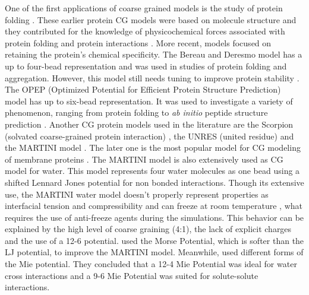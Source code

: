 One of the first applications of coarse grained models is the study of protein folding \cite{levitt1975,levitt1976}. These earlier protein CG models were based on molecule structure and they contributed for the knowledge of physicochemical forces associated with protein folding and protein interactions \cite{koga2001}.  More recent, models focused on retaining the protein's chemical specificity. The Bereau and Deresmo model \cite{bereau2009} has a up to four-bead representation and was used in studies of protein folding and aggregation. However, this model still needs tuning to improve protein stability \cite{bereau2010}. The OPEP (Optimized Potential for Efficient Protein Structure Prediction) model \cite{opep2014,opep2015} has up to six-bead representation. It was used to investigate a variety of phenomenon, ranging from protein folding to \textit{ab initio} peptide structure prediction \cite{opep2011,opep2009,opep20092}. Another CG protein models used in the literature are the Scorpion (solvated coarse-grained protein interaction)  \cite{scorpion2013}, the UNRES (united residue) \cite{unres2014} and the MARTINI model \cite{martini2013}. The later one is the most popular model for CG modeling of membrane proteins \cite{martini20132}. The MARTINI model is also extensively used as CG model for water. This model represents four water molecules as one bead using a shifted Lennard Jones potential for non bonded interactions. Though its extensive use, the MARTINI water model doesn't properly represent properties as interfacial tension and compressibility \cite{shinoda2010} and can freeze at room temperature \cite{winger2009,martini2007}, what requires the use of anti-freeze agents during the simulations. This behavior can be explained by the high level of coarse graining (4:1), the lack of explicit charges and the use of a 12-6 potential.  used the Morse Potential, which is softer than the LJ potential, to improve the MARTINI model. Meanwhile,  used different forms of the Mie potential. They concluded that a 12-4 Mie Potential was ideal for water cross interactions and  a 9-6 Mie Potential was suited for solute-solute interactions. 

